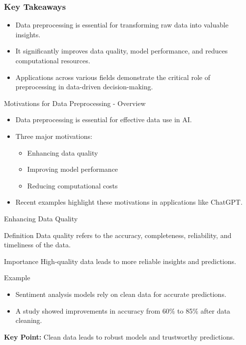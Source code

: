 \documentclass[aspectratio=169]{beamer}
\begin{document}
\begin{frame}[fragile]
    \frametitle{Key Takeaways}
    \begin{itemize}
        \item Data preprocessing is essential for transforming raw data into valuable insights.
        \item It significantly improves data quality, model performance, and reduces computational resources.
        \item Applications across various fields demonstrate the critical role of preprocessing in data-driven decision-making.
    \end{itemize}
\end{frame}

\begin{frame}[fragile]{Motivations for Data Preprocessing - Overview}
    \begin{itemize}
        \item Data preprocessing is essential for effective data use in AI.
        \item Three major motivations:
        \begin{itemize}
            \item Enhancing data quality
            \item Improving model performance
            \item Reducing computational costs
        \end{itemize}
        \item Recent examples highlight these motivations in applications like ChatGPT.
    \end{itemize}
\end{frame}

\begin{frame}[fragile]{Enhancing Data Quality}
    \begin{block}{Definition}
        Data quality refers to the accuracy, completeness, reliability, and timeliness of the data.
    \end{block}
    
    \begin{block}{Importance}
        High-quality data leads to more reliable insights and predictions.
    \end{block}
    
    \begin{block}{Example}
        \begin{itemize}
            \item Sentiment analysis models rely on clean data for accurate predictions.
            \item A study showed improvements in accuracy from 60\% to 85\% after data cleaning.
        \end{itemize}
    \end{block}
    
    \textbf{Key Point:} Clean data leads to robust models and trustworthy predictions.
\end{frame}
\end{document}
